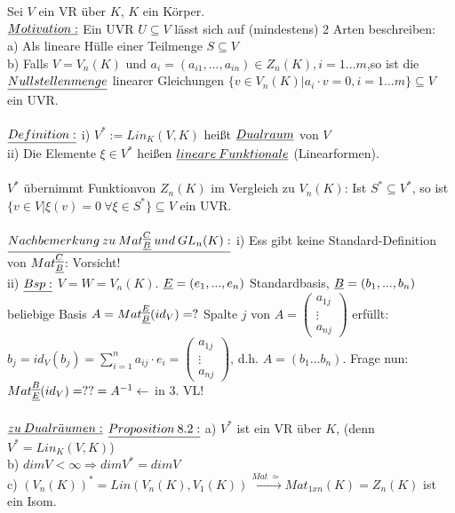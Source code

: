 \documentclass[fleqn, a4paper, 11pt]{article}
\begin{document}
Sei $V$ ein VR \"uber $K$, $K$ ein K\"orper.\\
$\uline{Motivation:}$ Ein UVR $U\subseteq V$ l\"asst sich auf (mindestens) 2 Arten beschreiben:\\
a) Als lineare H\"ulle einer Teilmenge $S\subseteq V$\\
b) Falls $V=V_n(K)$ und $a_i=(a_{i1},...,a_{in})\in Z_n(K),i=1...m$,so ist die $\uline{Nullstellenmenge}$ linearer Gleichungen $\{v\in V_n(K)|a_i \cdot v=0,i=1...m\}\subseteq V$ ein UVR.\\
\\
$\uline{Definition:}$ i) $V^{\ast}:=Lin_K(V,K)$ hei\ss{}t $\uline{Dualraum}$ von $V$\\
ii) Die Elemente $\xi\in V^{\ast}$ hei\ss{}en $\uline{lineare\:Funktionale}$ (Linearformen).\\
\\
$V^{\ast}$ \"ubernimmt \dq Funktion\dq von $Z_n(K)$ im Vergleich zu $V_n(K)$: Ist $S^{\ast}\subseteq V^{\ast}$, so ist $\{v\in V|\xi (v)=0\:\forall\xi\in S^{\ast}\}\subseteq V$ ein UVR.\\
\\
$\uline{Nachbemerkung\:zu\:Mat_{\uline{B}}^{\uline{C}}\:und\:GL_n(K):}$ i) Ess gibt keine Standard-Definition von $Mat_{\uline{B}}^{\uline{C}}$: Vorsicht!\\
ii) $\uline{Bsp:}$ $V=W=V_n(K)$. $\uline{E}=(e_1,...,e_n)$ Standardbasis, $\uline{B}=(b_1,...,b_n)$ beliebige Basis $A=Mat_{\uline{B}}^{\uline{E}}(id_V)=?$ Spalte $j$ von $A=\begin{pmatrix}
	a_{1j}\\
	\vdots\\
	a_{nj}
\end{pmatrix}$ erf\"ullt: $b_j=id_V(b_j)=\sum\limits_{i=1}^n a_{ij}\cdot e_i=\begin{pmatrix}
	a_{1j}\\
	\vdots\\
	a_{nj}
\end{pmatrix}$, d.h. $A=(b_1...b_n)$. Frage nun: $Mat_{\uline{E}}^{\uline{B}}(id_V)=??=A^{-1}\leftarrow$ in 3. VL!\\
\\
$\uline{zu\:Dualr\ddot{a}umen:}$
$\uline{Proposition\:8.2:}$ a) $V^{\ast}$ ist ein VR \"uber $K$, (denn $V^{\ast}=Lin_K(V,K)$)\\
b) $dim V<\infty\Rightarrow dim V^{\ast}=dim V$\\
c) $(V_n(K))^{\ast}=Lin (V_n(K),V_1(K))\stackrel{Mat\:\simeq}{\rightarrow}Mat_{1xn}(K)=Z_n(K)$ ist ein Isom.\\
\end{document}
